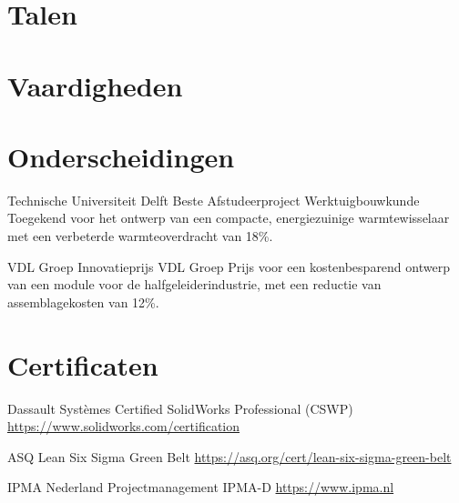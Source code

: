\documentclass[a4paper, serif, 10pt]{moderncv}
\begin{document}
\section{Talen}

\section{Vaardigheden}

\section{Onderscheidingen}

        {Technische Universiteit Delft}
        {Beste Afstudeerproject Werktuigbouwkunde}
        {}
        {}
        {Toegekend voor het ontwerp van een compacte, energiezuinige warmtewisselaar met een verbeterde warmteoverdracht van 18\%.}

        {VDL Groep}
        {Innovatieprijs VDL Groep}
        {}
        {}
        {Prijs voor een kostenbesparend ontwerp van een module voor de halfgeleiderindustrie, met een reductie van assemblagekosten van 12\%.}
\section{Certificaten}

        {Dassault Systèmes}
        {Certified SolidWorks Professional (CSWP)}
        {\url{https://www.solidworks.com/certification}}
        {}
        {}

        {ASQ}
        {Lean Six Sigma Green Belt}
        {\url{https://asq.org/cert/lean-six-sigma-green-belt}}
        {}
        {}

        {IPMA Nederland}
        {Projectmanagement IPMA-D}
        {\url{https://www.ipma.nl}}
        {}
        {}
\end{document}
